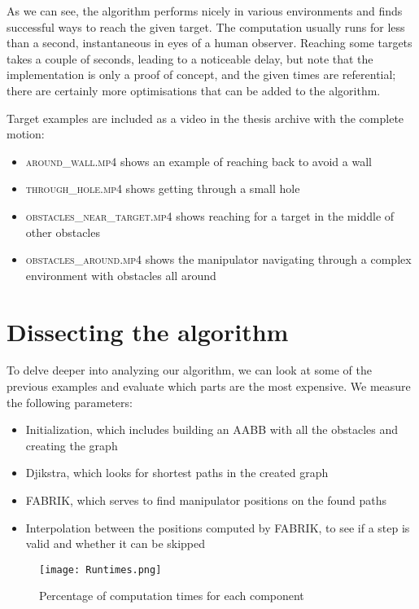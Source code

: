 As we can see, the algorithm performs nicely in various environments and finds successful ways to reach the given target. The computation usually runs for less than a second, instantaneous in eyes of a human observer. Reaching some targets takes a couple of seconds, leading to a noticeable delay, but note that the implementation is only a proof of concept, and the given times are referential; there are certainly more optimisations that can be added to the algorithm.

Target examples are included as a video in the thesis archive with the complete motion:

\begin{itemize}
\item \textsc{around\_wall.mp4} shows an example of reaching back to avoid a wall
\item \textsc{through\_hole.mp4} shows getting through a small hole
\item \textsc{obstacles\_near\_target.mp4} shows reaching for a target in the middle of other obstacles
\item \textsc{obstacles\_around.mp4} shows the manipulator navigating through a complex environment with obstacles all around
\end{itemize}

\newpage

\section{Dissecting the algorithm}

To delve deeper into analyzing our algorithm, we can look at some of the previous examples and evaluate which parts are the most expensive. We measure the following parameters:

\begin{itemize}
\item Initialization, which includes building an AABB with all the obstacles and creating the graph
\item Djikstra, which looks for shortest paths in the created graph
\item FABRIK, which serves to find manipulator positions on the found paths
\item Interpolation between the positions computed by FABRIK, to see if a step is valid and whether it can be skipped
\end{itemize}

\begin{figure}[ht]
  \centering
  \texttt{[image: Runtimes.png]}
  \caption{Percentage of computation times for each component}\label{fig:percentage}
\end{figure}


